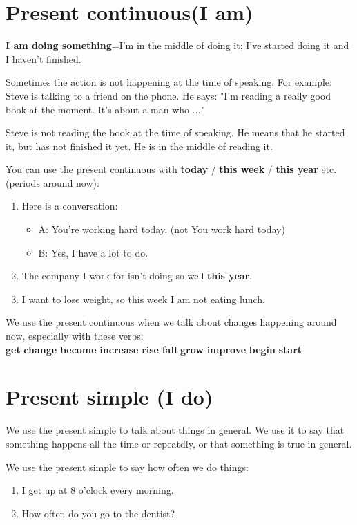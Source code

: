 \documentclass[12pt]{article}
\begin{document}
    \section{Present continuous(I am)}
    \textbf{I am doing something}=I'm in the middle of doing it; I've started doing it and I haven't
    finished. 

    Sometimes the action is not happening at the time of speaking. For example: \\
    Steve is talking to a friend on the phone. He says: "I'm reading a really good book at the moment.
    It's about a man who ..."

    Steve is not reading the book at the time of speaking. He means that he started it, but has not finished it yet.
    He is in the middle of reading it.

    You can use the present continuous with \textbf{today} / \textbf{this week} / \textbf{this year} etc. (periods around now):
    \begin{enumerate}
        \item Here is a conversation:
        \begin{itemize}
            \item A: You're working hard today. (not You work hard today)
            \item B: Yes, I have a lot to do.
        \end{itemize}
        \item The company I work for isn't doing so well \textbf{this year}.
        \item I want to lose weight, so this week I am not eating lunch.
    \end{enumerate}

    We use the present continuous when we talk about changes happening around now, especially with these verbs:\\
    \textbf{get} \quad \textbf{change} \quad \textbf{become} \quad \textbf{increase} \quad \textbf{rise} \quad \textbf{fall} \quad \textbf{grow}
    \quad \textbf{improve} \quad \textbf{begin} \quad \textbf{start}

    \section{Present simple (I do)}
    We use the present simple to talk about things in general. We use it to say that something happens all the time or repeatdly,
    or that something is true in general.

    We use the present simple to say how often we do things:
    \begin{enumerate}
        \item I get up at 8 o'clock every morning.
        \item How often do you go to the dentist?
    \end{enumerate}
\end{document}
